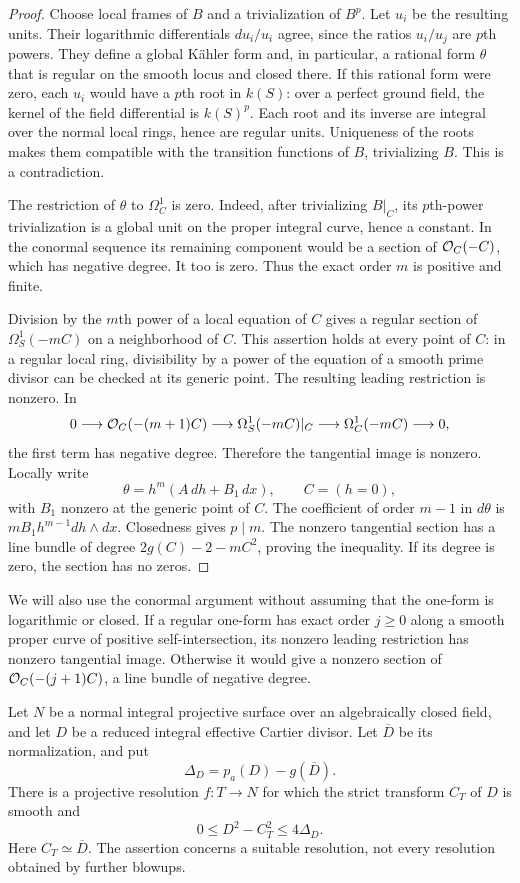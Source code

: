 \begin{proof}
Choose local frames of $B$ and a trivialization of $B^p$.
Let $u_i$ be the resulting units. Their logarithmic differentials
$du_i/u_i$ agree, since the ratios $u_i/u_j$ are $p$th powers.
They define a global K\"ahler form and, in particular, a rational
form $\theta$ that is regular on the smooth locus and closed there.
If this rational form were zero, each $u_i$ would have a $p$th root
in $k(S)$: over a perfect ground field, the kernel of the field
differential is $k(S)^p$. Each root and its inverse are integral over
the normal local rings, hence are regular units. Uniqueness of the
roots makes them compatible with the transition functions of $B$,
trivializing $B$. This is a contradiction.

The restriction of $\theta$ to $\Omega_C^1$ is zero. Indeed, after
trivializing $B|_C$, its $p$th-power trivialization is a global unit
on the proper integral curve, hence a constant. In the conormal
sequence its remaining component would be a section of
$\mathcal O_C(-C)$, which has negative degree. It too is zero.
Thus the exact order $m$ is positive and finite.

Division by the $m$th power of a local equation of $C$ gives a
regular section of $\Omega_S^1(-mC)$ on a neighborhood of $C$.
This assertion holds at every point of $C$: in a regular local
ring, divisibility by a power of the equation of a smooth prime
divisor can be checked at its generic point. The resulting leading
restriction is nonzero. In
\[
0\longrightarrow\mathcal O_C(-(m+1)C)
\longrightarrow\Omega_S^1(-mC)|_C
\longrightarrow\Omega_C^1(-mC)\longrightarrow0,
\]
the first term has negative degree. Therefore the tangential image
is nonzero. Locally write
\[
 \theta=h^m(A\,dh+B_1\,dx),\qquad C=(h=0),
\]
with $B_1$ nonzero at the generic point of $C$.
The coefficient of order $m-1$ in $d\theta$ is
$mB_1h^{m-1}dh\wedge dx$. Closedness gives $p\mid m$.
The nonzero tangential section has a line bundle of degree
$2g(C)-2-mC^2$, proving the inequality. If its degree is zero,
the section has no zeros.
\end{proof}

We will also use the conormal argument without assuming that the
one-form is logarithmic or closed. If a regular one-form has exact
order $j\geq0$ along a smooth proper curve of positive
self-intersection, its nonzero leading restriction has nonzero
tangential image. Otherwise it would give a nonzero section of
$\mathcal O_C(-(j+1)C)$, a line bundle of negative degree.

\begin{lemma}\label{lem:positive-square-resolution-loss}
Let $N$ be a normal integral projective surface over an algebraically
closed field, and let $D$ be a reduced integral effective Cartier
divisor. Let $\overline D$ be its normalization, and put
\[
 \Delta_D=p_a(D)-g(\overline D).
\]
There is a projective resolution $f:T\to N$ for which the strict
transform $C_T$ of $D$ is smooth and
\[
 0\leq D^2-C_T^2\leq4\Delta_D.
\]
Here $C_T\simeq\overline D$. The assertion concerns a suitable
resolution, not every resolution obtained by further blowups.
\end{lemma}


